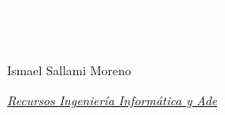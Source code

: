 \documentclass[12pt]{book} %
\begin{document}
\begin{titlepage}
\begin{center}
        \vspace{5cm} %
        {\Huge \bfseries\scshape\textcolor{white}{Diseño y Desarrollo de
SI} \par}
        \vspace{0.5cm}
        {\Large \itshape\textcolor{white}{Temario} \par}
        \vspace{0.5cm}


        \vfill
        

        \begin{flushright}
            {Ismael Sallami Moreno \par}
            {\small \itshape \href{https://elblogdeismael.github.io}{Recursos Ingeniería Informática y Ade} \par}
        \end{flushright}
        \vspace{0.3cm}
        
        
    \end{center}
    
    \restoregeometry
\end{titlepage}


\end{document}
